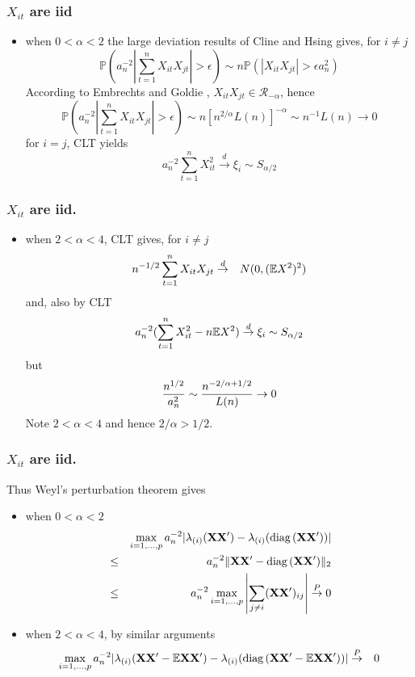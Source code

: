 \documentclass{beamer}
\renewcommand{\P}{
\mathbb P
}
\begin{document}
\begin{frame}
  \frametitle{$X_{it}$ are iid}
  \begin{itemize}
  \item when $0 < \alpha  < 2$ the large deviation results of Cline
    and Hsing \cite{ClingHsing1998} gives, for $i \neq j$
    \[
    \P(a_n^{-2} |\sum_{t=1}^n X_{it}X_{jt}| > \epsilon) \sim n
    \P(|X_{it}X_{jt}| > \epsilon a_n^2)
    \]
    According to Embrechts and Goldie \cite{Embrechts1982263},
    $X_{it}X_{jt} \in \mathcal R_{-\alpha}$, hence
    \[
    \P(a_n^{-2} |\sum_{t=1}^n X_{it}X_{jt}| > \epsilon) \sim n
    [n^{2/\alpha} L(n)]^{-\alpha} \sim n^{-1} L(n) \to 0
    \]
    for $i = j$, CLT yields
    \[
    a_n^{-2} \sum_{t=1}^n X_{it}^2 \overset{d}{\to} \xi_i \sim S_{\alpha/2}
    \]
  \end{itemize}
\end{frame}

\begin{frame}
  \frametitle{$X_{it}$ are iid.}
  \begin{itemize}
  \item when $2 < \alpha < 4$, CLT gives, for $i \neq j$
    \begin{eqnarray*}
      n^{-1/2} \sum_{t=1}^n X_{it}X_{jt} &\overset{d}{\to}& N(0, (\mathbb{E} X^2)^2)
    \end{eqnarray*}
    and, also by CLT
    \[
    a_n^{-2}(\sum_{t=1}^n X_{it}^2 - n \mathbb{E} X^2) \overset{d}{\to} \xi_i
    \sim S_{\alpha/2}
    \]
    but
    \[
    {n^{1/2} \over a_n^2} \sim {n^{-2/\alpha + 1/2} \over L(n)} \to 0
    \]
    Note $2 < \alpha < 4$ and hence $2/\alpha > 1/2$.
  \end{itemize}
\end{frame}

\begin{frame}
  \frametitle{$X_{it}$ are iid.}
  Thus Weyl's perturbation theorem gives
  \begin{itemize}
  \item when $0 < \alpha < 2$
    \begin{eqnarray*}
    && \max_{i=1,\dots,p} a_n^{-2} |\lambda_{(i)}(\mathbf{XX'}) - \lambda_{(i)}(\text{diag\,}(\mathbf{XX'}))| \\
    &\leq& a_n^{-2} \|\mathbf{XX'} - \text{diag\,}(\mathbf{XX'})\|_2 \\
    &\leq& a_n^{-2} \max_{i=1,\dots,p} \left|\sum_{j\neq i} (\mathbf{XX'})_{ij}\right|
    \overset{P}{\to} 0
    \end{eqnarray*}
  \item when $2 < \alpha < 4$, by similar arguments
    \begin{eqnarray*}
      \max_{i=1,\dots,p} a_n^{-2} |\lambda_{(i)}(\mathbf{XX'} - \mathbb{E} \mathbf{XX'}) -
      \lambda_{(i)}(\text{diag\,}(\mathbf{XX'} - \mathbb{E} \mathbf{XX'}))|
      &\overset{P}{\to}& 0
    \end{eqnarray*}
  \end{itemize}
\end{frame}
\end{document}
